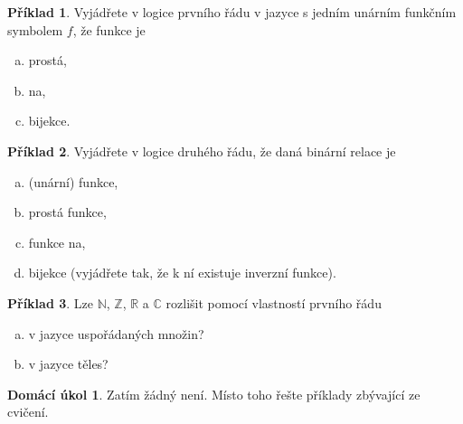 \documentclass[a4paper]{article}
\theoremstyle{definition}
\newtheorem{problem}{Příklad}
\newtheorem*{ukol}{Domácí úkol}
\begin{document}
\medskip\begin{problem} Vyjádřete v logice prvního řádu v jazyce s jedním unárním funkčním symbolem $f$, že funkce je
\begin{enumerate}[(a)]
    \item prostá,
    \item na,
    \item bijekce.
\end{enumerate}
\end{problem}


\medskip\begin{problem} Vyjádřete v logice druhého řádu, že daná binární relace je 
\begin{enumerate}[(a)]
    \item (unární) funkce,
    \item prostá funkce,
    \item funkce na,
    \item bijekce (vyjádřete tak, že k ní existuje inverzní funkce).
\end{enumerate}
\end{problem}


\medskip\begin{problem}
Lze $\mathbb N$, $\mathbb Z$, $\mathbb R$ a $\mathbb C$ rozlišit pomocí vlastností prvního řádu
\begin{enumerate}[(a)]
    \item v jazyce uspořádaných množin?
    \item v jazyce těles?
\end{enumerate}
\end{problem}


\medskip\begin{ukol}
Zatím žádný není. Místo toho řešte příklady zbývající ze cvičení.
\end{ukol}
\end{document}

